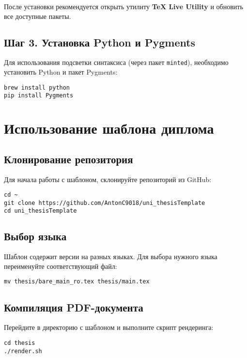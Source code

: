 \documentclass[a4paper,12pt]{report}
\begin{document}
После установки рекомендуется открыть утилиту \textbf{TeX Live Utility} и обновить все доступные пакеты.

\subsection*{Шаг 3. Установка Python и Pygments}

Для использования подсветки синтаксиса (через пакет \verb|minted|), необходимо установить Python и пакет Pygments:

\begin{verbatim}
brew install python
pip install Pygments
\end{verbatim}

\section{Использование шаблона диплома}

\subsection*{Клонирование репозитория}

Для начала работы с шаблоном, склонируйте репозиторий из GitHub:

\begin{verbatim}
cd ~
git clone https://github.com/AntonC9018/uni_thesisTemplate
cd uni_thesisTemplate
\end{verbatim}

\subsection*{Выбор языка}

Шаблон содержит версии на разных языках. Для выбора нужного языка переименуйте соответствующий файл:

\begin{verbatim}
mv thesis/bare_main_ro.tex thesis/main.tex
\end{verbatim}

\subsection*{Компиляция PDF-документа}

Перейдите в директорию с шаблоном и выполните скрипт рендеринга:

\begin{verbatim}
cd thesis
./render.sh
\end{verbatim}
\end{document}
